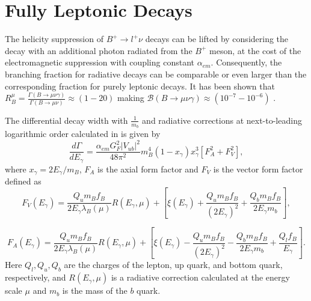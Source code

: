 \section{Fully Leptonic  Decays}
\label{lnugamma}
The helicity suppression of $B^{+}\rightarrow l^{+} \nu$ decays can be lifted by considering the decay with an additional photon radiated from the $B^{+}$ meson, at the cost of the electromagnetic suppression with coupling constant $\alpha_{em}$. Consequently, the branching fraction for radiative decays can be comparable or even larger than the corresponding fraction for purely leptonic decays. It has been shown that $R^{\mu}_{B}=\frac{\Gamma(B\rightarrow \mu \nu \gamma)}{\Gamma(B\rightarrow \mu \nu)}\approx(1-20)$ making $\mathcal{B}(B\rightarrow \mu \nu \gamma)\approx(10^{-7}-10^{-6})$ \cite{Burdman:1994ip}.

The differential decay width with $\frac{1}{m_{b}}$ and radiative corrections
at next-to-leading logarithmic order calculated in\cite{Beneke:2011nf} is given by
\begin{equation}
\frac{d\Gamma}{dE_{\gamma}} = \frac{\alpha_{em}G^{2}_{F}|V_{ub}|^{2}}{48 \pi^{2}}m_{B}^{4}(1 - x_{\gamma})x_{\gamma}^{3}[F_A^{2} + F_V^{2}],
\end{equation}
 where $x_{\gamma} = 2E_{\gamma}/m_{B}$, $F_A$ is the axial form factor and $F_V$  is the vector form factor defined as
\begin{equation}
F_{V}(E_{\gamma}) = \frac{Q_{u}m_{B}f_{B}}{2E_{\gamma}\lambda_{B}(\mu)} R(E_{\gamma}, \mu) + [\xi(E_\gamma) +  \frac{Q_{u}m_{B}f_{B}}{(2E_{\gamma})^{2}} + \frac{Q_{b}m_{B}f_{B}}{2E_{\gamma}m_{b}}],
\label{eq:top1}
\end{equation}

\begin{equation}
F_{A}(E_{\gamma}) = \frac{Q_{u}m_{B}f_{B}}{2E_{\gamma}\lambda_{B}(\mu)} R(E_{\gamma}, \mu) + [\xi(E_\gamma) -  \frac{Q_{u}m_{B}f_{B}}{(2E_{\gamma})^{2}} - \frac{Q_{b}m_{B}f_{B}}{2E_{\gamma}m_{b}} + \frac{Q_{l}f_{B}}{E_{\gamma}}].
\label{eq:top2}
\end{equation}
Here $Q_{l},Q_{u},Q_{b}$ are the charges of the lepton, up quark, and
bottom quark, respectively, and $R(E_{\gamma}, \mu)$ is a radiative correction
calculated at the energy scale $\mu$ %
and $m_{b}$ is the mass of the $b$ quark.

